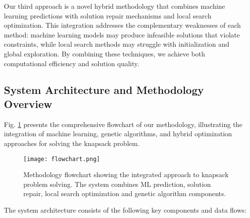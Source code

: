 \documentclass[conference, a4paper]{IEEEtran}
\begin{document}
Our third approach is a novel hybrid methodology that combines machine learning predictions with solution repair mechanisms and local search optimization. This integration addresses the complementary weaknesses of each method: machine learning models may produce infeasible solutions that violate constraints, while local search methods may struggle with initialization and global exploration. By combining these techniques, we achieve both computational efficiency and solution quality.

\subsection{System Architecture and Methodology Overview}

Fig. \ref{fig:methodology} presents the comprehensive flowchart of our methodology, illustrating the integration of machine learning, genetic algorithms, and hybrid optimization approaches for solving the knapsack problem.

\begin{figure}[htbp]
\centerline{\texttt{[image: flowchart.png]}}
\caption{Methodology flowchart showing the integrated approach to knapsack problem solving. The system combines ML prediction, solution repair, local search optimization and genetic algorithm components.}
\label{fig:methodology}
\end{figure}

The system architecture consists of the following key components and data flows:
\end{document}

